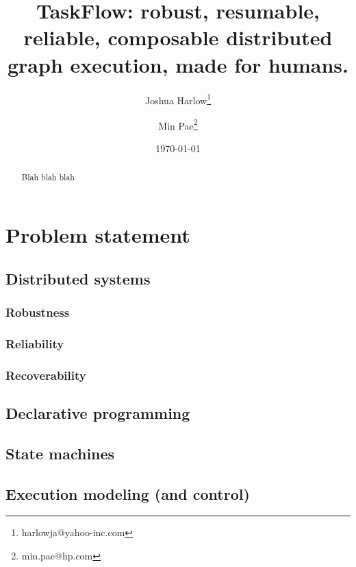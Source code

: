 \documentclass[11pt,a4paper]{article}
\begin{document}
\title{TaskFlow: robust, resumable, reliable, composable distributed graph
       execution, made for humans.}

\author[1]{Joshua Harlow\thanks{harlowja@yahoo-inc.com}}
\author[2]{Min Pae\thanks{min.pae@hp.com}}

\date{\today}

\maketitle

\begin{abstract}

Blah blah blah

\end{abstract}

\section{Problem statement}

\subsection{Distributed systems}

\subsubsection{Robustness}

\subsubsection{Reliability}

\subsubsection{Recoverability}

\subsection{Declarative programming}

\subsection{State machines}

\subsection{Execution modeling (and control)}
\end{document}
